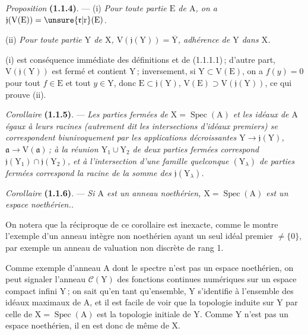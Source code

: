 \textit{Proposition} \textbf{(1.1.4)}. --- (i) \textit{Pour toute partie $\mathrm{E}$ de $\mathrm{A}$, on a $\mathfrak{j}(\mathrm{V}(\mathrm{E}))=\unsure{\mathfrak{r}|\mathrm{r}}(\mathrm{E})$.}

(ii) \textit{Pour toute partie $\mathrm{Y}$ de $\mathrm{X}$, $\mathrm{V}(\mathfrak{j}(\mathrm{Y}))=\overline{\mathrm{Y}}$, adhérence de $\mathrm{Y}$ dans $\mathrm{X}$.}

(i) est conséquence immédiate des définitions et de (1.1.1.1)\,; d’autre part, $\mathrm{V}(\mathfrak{j}(\mathrm{Y}))$ est fermé et contient $\mathrm{Y}$\,; inversement, si $\mathrm{Y}\subset \mathrm{V}(\mathrm{E})$, on a $f(y)=0$ pour tout $f\in \mathrm{E}$ et tout $y\in \mathrm{Y}$, donc $\mathrm{E}\subset\mathfrak{j}(\mathrm{Y})$, $\mathrm{V}(\mathrm{E})\supset \mathrm{V}(\mathfrak{j}(\mathrm{Y}))$, ce qui prouve (ii).

\textit{Corollaire} \textbf{(1.1.5)}. --- \textit{Les parties fermées de $\mathrm{X}=\operatorname{Spec}(\mathrm{A})$ et les idéaux de $\mathrm{A}$ égaux à leurs racines (autrement dit les intersections d’idéaux premiers) se correspondent biunivoquement par les applications décroissantes $\mathrm{Y}\to\mathfrak{j}(\mathrm{Y})$, $\mathfrak{a}\to \mathrm{V}(\mathfrak{a})$\,; à la réunion $\mathrm{Y}_1\cup \mathrm{Y}_2$ de deux parties fermées correspond $\mathfrak{j}(\mathrm{Y}_1)\cap\mathfrak{j}(\mathrm{Y}_2)$, et à l’intersection d’une famille quelconque $(\mathrm{Y}_\lambda)$ de parties fermées correspond la racine de la somme des $\mathfrak{j}(\mathrm{Y}_\lambda)$.}

\textit{Corollaire} \textbf{(1.1.6)}. --- \textit{Si $\mathrm{A}$ est un anneau noethérien, $\mathrm{X}=\operatorname{Spec}(\mathrm{A})$ est un espace noethérien..}

On notera que la réciproque de ce corollaire est inexacte, comme le montre l’exemple d’un anneau intègre non noethérien ayant un seul idéal premier $\ne\{0\}$, par exemple un anneau de valuation non discrète de rang 1.

Comme exemple d’anneau $\mathrm{A}$ dont le spectre n’est pas un espace noethérien, on peut signaler l’anneau $\mathscr{C}(\mathrm{Y})$ des fonctions continues numériques sur un espace compact infini $\mathrm{Y}$\,; on sait qu’en tant qu’ensemble, $\mathrm{Y}$ s’identifie à l’ensemble des idéaux maximaux de $\mathrm{A}$, et il est facile de voir que la topologie induite sur $\mathrm{Y}$ par celle de $\mathrm{X}=\operatorname{Spec}(\mathrm{A})$ est la topologie initiale de $\mathrm{Y}$. Comme $\mathrm{Y}$ n’est pas un espace noethérien, il en est donc de même de $\mathrm{X}$.


